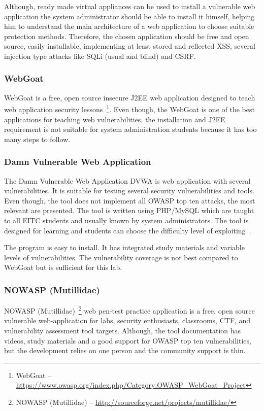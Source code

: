 Although, ready made virtual appliances can be used to install a vulnerable web application the
system administrator should be able to install it himself, helping him to understand the main architecture of a web application to choose suitable protection methods. Therefore, the chosen application should be free and open source, easily installable, implementing  at least stored and reflected \gls{XSS}, several injection type attacks like \gls{SQLi} (usual and blind) and \gls{CSRF}.

\subsubsection{WebGoat}
WebGoat is a free, open source insecure J2EE web application designed to teach web application security lessons~\footnote{WebGoat -- \url{https://www.owasp.org/index.php/Category:OWASP_WebGoat_Project}}.  Even though, the WebGoat is one of the best applications for teaching web vulnerabilities, the installation and J2EE requirement is not suitable for system administration students because it has too many steps to follow.


\subsubsection{Damn Vulnerable Web Application}
The Damn Vulnerable Web Application \gls{DVWA} is web application with several vulnerabilities. It is suitable for testing several security vulnerabilities and tools. Even though, the tool does not implement all \gls{OWASP} top ten attacks, the most relevant are presented. The tool is written using PHP/MySQL which are taught to all \gls{EITC} students and usually known by system administrators. The tool is designed for learning and students can choose the difficulty level of exploiting~\citep{website:dvwa}.

The program is easy to install. It has integrated study materials and variable levels of vulnerabilities.
The vulnerability coverage is not best compared to WebGoat but is sufficient for this lab.

\subsubsection{NOWASP (Mutillidae)}
NOWASP (Mutillidae)~\footnote{NOWASP (Mutillidae) -- \url{http://sourceforge.net/projects/mutillidae/}} web pen-test practice application is a free, open source vulnerable web-application for labs, security enthusiasts, classrooms, \gls{CTF}, and vulnerability assessment tool targets. \citep{website:Mutillidae} Although, the tool documentation has videos, study materials and a good support for \gls{OWASP} top ten vulnerabilities, but the development relies on one person and the community support is thin.
